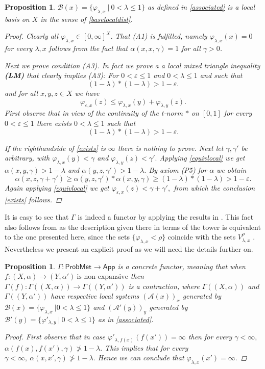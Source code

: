 \documentclass[12pt,a4paper]{amsart}
\theoremstyle{theorem}
\newtheorem{proposition}[theorem]{Proposition}
\theoremstyle{definition}
\newcommand{\aaa}{\ensuremath{\mathcal{A}}}
\newcommand{\bbb}{\ensuremath{\mathcal{B}}}
\newcommand{\app}{\ensuremath{\mathsf{App}}}
\newcommand{\PM}{\ensuremath{\mathsf{ProbMet_{}}}}
\renewcommand{\a}{\ensuremath{\alpha}}
\newcommand{\ve}{\ensuremath{\varepsilon}}
\renewcommand{\l}{\ensuremath{\lambda}}
\def\rw{\rightarrow}
\begin{document}
{\begin{proposition}\label{uap2}
$\bbb(x) = \{ \varphi_{\l,x} \ | \ 0 < \l \leq 1 \} $ as defined in \eqref{associated} is a local basis on $X$ in the sense of \ref{baselocaldist}.
\begin{proof}
Clearly all $\varphi_{\l,x} \in [0,\infty]^X.$
That (A1) is fulfilled, namely $\varphi_{\l,x} (x) = 0$ for every $\l,x$ follows from the fact that $\a(x,x,\gamma) = 1$ for all $\gamma>0$.

Next we prove condition (A3). In fact we prove a \emph{a local mixed triangle inequality} {\bf(LM)} 
that clearly implies (A3):
 For $0 < \ve \leq 1$ and
$0<\l \leq 1$ and such that 
$$
(1-\l) * (1-\l) > 1 - \ve.
$$
and for all $x,y,z \in X$ we have
\begin{equation}\label{exists}
\varphi_{\ve,x} (z) \leq \varphi_{\l,x} (y) + \varphi_{\l, y} (z).
\end{equation}
First observe that in view of the continuity of the t-norm $*$ on $[0,1]$ for every $0 < \ve \leq 1$ there exists $0<\l \leq 1$ such that 
$$
(1-\l) * (1-\l) > 1 - \ve.
$$

If the righthandside of \eqref{exists} is $\infty$ there is nothing to prove. 
Next let $\gamma, \gamma'$ be arbitrary, with $\varphi_{\l,x} (y) < \gamma$ and $\varphi_{\l, y} (z) <\gamma'.$
Applying \eqref{equivlocal} we get $\a(x,y,\gamma) > 1 - \l$ and $\a(y,z,\gamma') > 1 - \l$.
By axiom (P5) for $\a$ we obtain 
$$
\a(x,z, \gamma + \gamma') \geq \a(y,z,\gamma') * \a(x,y,\gamma) \geq (1-\l) * (1-\l) > 1 - \ve.
$$
Again applying \eqref{equivlocal} we get $\varphi _{\ve,x}(z) < \gamma+ \gamma',$ from which the conclusion \eqref{exists} follows.

\end{proof}
\end{proposition}

It is easy to see that $\Gamma$ is indeed a functor by applying the results in \cite{LSY}. This fact also follows from \cite{CL} as the description given there in terms of the tower is equivalent to the one presented here, since the sets $\{\varphi _{\l,x} < \rho\}$ coincide with the sets $V_{\l,x}^\rho$ \cite{CL}.
Nevertheless we present an explicit proof as we will need the details further on.

\begin{proposition}\label{functoruap}
$\Gamma: \PM \rw \app$ is a concrete functor, meaning that when  $f: (X,\a) \rw (Y, \a')\  \text{is non-expansive}$ then $\Gamma(f) :  \Gamma((X, \a)) \rw \Gamma((Y,\a'))$ is a contraction, where $\Gamma((X, \a)) $ and $\Gamma((Y, \a')) $ have respective local systems
$(\aaa(x))_x$ generated by $\bbb(x) =\{ \varphi_{\l,x} \ | 0 < \l \leq 1\} $ and $(\aaa'(y))_{y}$ generated by $\bbb'(y)=\{ \varphi'_{\l,y} \ | \ 0 < \l \leq 1\} $ as in \eqref{associated}.
\begin{proof}
First observe that in case $\varphi'_{\l,f(x)} (f(x'))= \infty$ then for every $\gamma < \infty,$\\
$ \a(f(x), f(x'), \gamma) \not > 1 - \l.$
This implies that for every $\gamma < \infty,\  \a(x,x',\gamma) \not > 1 - \l.$ Hence we can conclude that $\varphi _{\l, x}(x') = \infty.$


\end{proof}
\end{proposition}}
\end{document}

